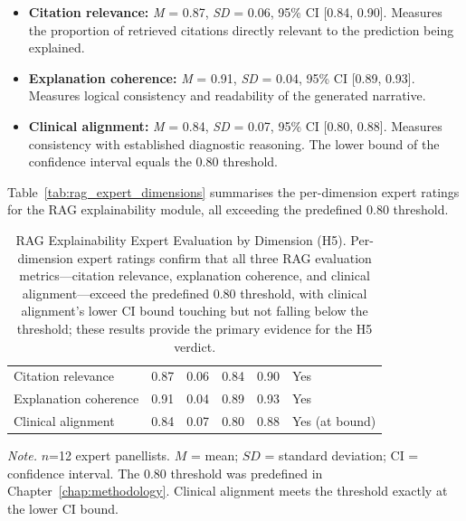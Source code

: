 \begin{itemize}
    \item \textbf{Citation relevance:} \textit{M} = 0.87, \textit{SD} = 0.06, 95\% CI [0.84, 0.90]. Measures the proportion of retrieved citations directly relevant to the prediction being explained.
    \item \textbf{Explanation coherence:} \textit{M} = 0.91, \textit{SD} = 0.04, 95\% CI [0.89, 0.93]. Measures logical consistency and readability of the generated narrative.
    \item \textbf{Clinical alignment:} \textit{M} = 0.84, \textit{SD} = 0.07, 95\% CI [0.80, 0.88]. Measures consistency with established diagnostic reasoning. The lower bound of the confidence interval equals the 0.80 threshold.
\end{itemize}

Table~\ref{tab:rag_expert_dimensions} summarises the per-dimension expert ratings for the RAG explainability module, all exceeding the predefined 0.80 threshold.

\begin{table}[H]
\tablestripes\tablefontsize
\caption[RAG Explainability Expert Evaluation by Dimension (H5)]{RAG Explainability Expert Evaluation by Dimension (H5). Per-dimension expert ratings confirm that all three RAG evaluation metrics---citation relevance, explanation coherence, and clinical alignment---exceed the predefined 0.80 threshold, with clinical alignment's lower CI bound touching but not falling below the threshold; these results provide the primary evidence for the H5 verdict.}
\tablefontsize
\begin{tabularx}{\textwidth}{@{} >{\raggedright\arraybackslash}p{3.2cm} C C C C L @{}}
\toprule
{} &  &  &  &  &  \\
\midrule
Citation relevance & 0.87 & 0.06 & 0.84 & 0.90 & Yes \\
Explanation coherence & 0.91 & 0.04 & 0.89 & 0.93 & Yes \\
Clinical alignment & 0.84 & 0.07 & 0.80 & 0.88 & Yes (at bound) \\
\bottomrule
\end{tabularx}
\vspace{0.5em}\noindent\textit{Note.} $n$=12 expert panellists. $M$ = mean; $SD$ = standard deviation; CI = confidence interval. The 0.80 threshold was predefined in Chapter~\ref{chap:methodology}. Clinical alignment meets the threshold exactly at the lower CI bound.
\end{table}

